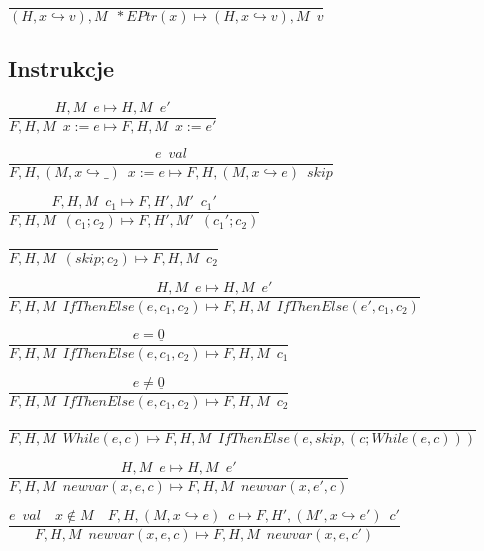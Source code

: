 \documentclass{article}
\begin{document}
\centerline{$\dfrac{}{(H, x \hookrightarrow v), M \enspace *EPtr(x) \longmapsto (H, x \hookrightarrow v), M \enspace v}$}\vspace{5pt}

\subsection{Instrukcje}

\centerline{$\dfrac{H, M \enspace e \longmapsto H, M \enspace e'}{F, H, M \enspace x:=e \longmapsto F, H, M \enspace x:=e'}$}\vspace{5pt}

\centerline{$\dfrac{e \enspace val}{F, H, (M, x\hookrightarrow \_) \enspace x:=e \longmapsto F, H, (M, x \hookrightarrow e) \enspace skip}$}\vspace{5pt}

\centerline{$\dfrac{F, H, M \enspace c_1 \longmapsto F, H', M' \enspace c_1'}{F, H, M \enspace (c_1 ; c_2) \longmapsto F, H', M' \enspace (c_1'; c_2)  }$}\vspace{5pt}

\centerline{$\dfrac{}{F, H, M \enspace (skip ; c_2) \longmapsto F, H, M \enspace c_2 }$}\vspace{5pt}

\centerline{$\dfrac{H, M \enspace e \longmapsto H, M \enspace e'}{F, H, M \enspace IfThenElse(e, c_1, c_2) \longmapsto F, H, M \enspace IfThenElse(e', c_1, c_2)  }$}\vspace{5pt}

\centerline{$\dfrac{e = \underline{0}}{F, H, M \enspace IfThenElse(e, c_1, c_2) \longmapsto F, H, M \enspace c_1  }$}\vspace{5pt}

\centerline{$\dfrac{e \neq \underline{0}}{F, H, M \enspace IfThenElse(e, c_1, c_2) \longmapsto F, H, M \enspace c_2  }$}\vspace{5pt}

\centerline{$\dfrac{}{F, H, M \enspace While(e, c) \longmapsto F, H, M \enspace IfThenElse(e, skip, (c; While(e, c)))  }$}\vspace{5pt}

\centerline{$\dfrac{H, M \enspace e \longmapsto H, M \enspace e'}{F, H, M \enspace newvar(x, e, c) \longmapsto F, H, M \enspace newvar(x, e', c)  }$}\vspace{5pt}

\centerline{$\dfrac{e \enspace val \quad x \notin M \quad F, H, (M, x \hookrightarrow e)  \enspace c \longmapsto F, H', (M', x \hookrightarrow e') \enspace c'}{F, H, M \enspace newvar(x, e, c) \longmapsto F, H, M \enspace newvar(x, e, c')  }$}\vspace{5pt}
\end{document}

